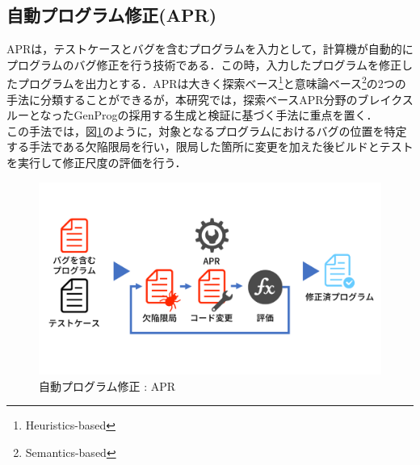 \documentclass[uplatex,dvipdfmx,a4paper]{jsarticle}
\let\oldcite\cite
\renewcommand{\cite}[1]{\xspace\oldcite{#1}}
\begin{document}
\subsection{自動プログラム修正(APR)}\label{sec:apr}
APRは，テストケースとバグを含むプログラムを入力として，計算機が自動的にプログラムのバグ修正を行う技術である．この時，入力したプログラムを修正したプログラムを出力とする．APRは大きく探索ベース\footnote{Heuristics-based}と意味論ベース\footnote{Semantics-based}\cite{le2018overfitting}の2つの手法に分類することができるが，本研究では，探索ベースAPR分野のブレイクスルーとなったGenProg\cite{le2011genprog}の採用する生成と検証\cite{martinez2019astor}に基づく手法に重点を置く．\\
この手法では，図\ref{fig:apr}のように，対象となるプログラムにおけるバグの位置を特定する手法である欠陥限局を行い，限局した箇所に変更を加えた後ビルドとテストを実行して修正尺度の評価を行う．
\begin{figure}[t]
  \centering
  \includegraphics[width=\linewidth]{fig/apr.pdf}
  \caption{自動プログラム修正 : APR}
  \label{fig:apr}
\end{figure}
\end{document}
